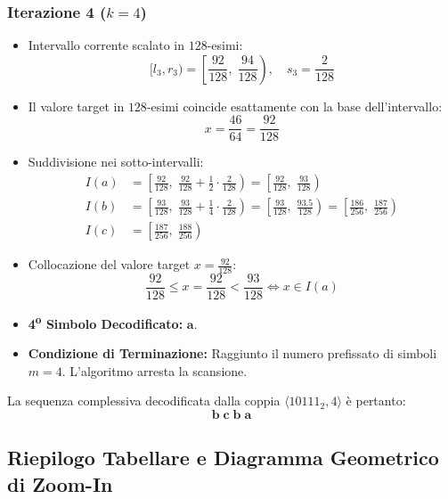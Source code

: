\subsubsection*{Iterazione 4 ($k = 4$)}
\begin{itemize}
  \item Intervallo corrente scalato in $128$-esimi:
  \begin{equation}
    [l_3, r_3) = \left[ \frac{92}{128}, \; \frac{94}{128} \right), \quad s_3 = \frac{2}{128}
  \end{equation}
  \item Il valore target in $128$-esimi coincide esattamente con la base dell'intervallo:
  \begin{equation}
    x = \frac{46}{64} = \frac{92}{128}
  \end{equation}
  \item Suddivisione nei sotto-intervalli:
  \begin{align}
    I(a) &= \left[ \frac{92}{128}, \; \frac{92}{128} + \frac{1}{2} \cdot \frac{2}{128} \right) = \left[ \frac{92}{128}, \; \frac{93}{128} \right) \\
    I(b) &= \left[ \frac{93}{128}, \; \frac{93}{128} + \frac{1}{4} \cdot \frac{2}{128} \right) = \left[ \frac{93}{128}, \; \frac{93.5}{128} \right) = \left[ \frac{186}{256}, \; \frac{187}{256} \right) \\
    I(c) &= \left[ \frac{187}{256}, \; \frac{188}{256} \right)
  \end{align}
  \item Collocazione del valore target $x = \frac{92}{128}$:
  \begin{equation}
    \frac{92}{128} \le x = \frac{92}{128} < \frac{93}{128} \iff x \in I(a)
  \end{equation}
  \item \textbf{4\textsuperscript{o} Simbolo Decodificato:} $\mathbf{a}$.
  \item \textbf{Condizione di Terminazione:} Raggiunto il numero prefissato di simboli $m = 4$. L'algoritmo arresta la scansione.
\end{itemize}

La sequenza complessiva decodificata dalla coppia $\langle 10111_2, 4 \rangle$ \`e pertanto:
\begin{equation}
  \mathbf{b} \; \mathbf{c} \; \mathbf{b} \; \mathbf{a}
\end{equation}

\FloatBarrier
\subsection{Riepilogo Tabellare e Diagramma Geometrico di Zoom-In}
\label{subsec:riepilogo-zoom-in}

